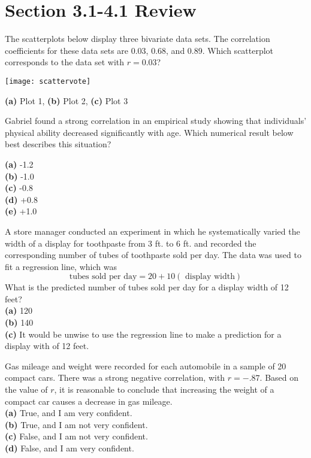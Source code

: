 \documentclass[Lecture.tex]{subfiles}
\begin{document}
\section{Section 3.1-4.1 Review}

\begin{frame}
The scatterplots below display three bivariate data sets.  The correlation coefficients for these data sets are 0.03, 0.68, and 0.89.  Which scatterplot corresponds to the data set with $r=0.03$?
\begin{center}
\texttt{[image: scattervote]}
\end{center}
{\bf (a)} Plot 1, {\bf (b)} Plot 2, {\bf (c)} Plot 3
\end{frame}

\begin{frame}
Gabriel found a strong correlation in an empirical study showing that individuals' physical ability decreased significantly with age.  Which numerical result below best describes this situation?\\
\begin{center}
{\bf (a)} -1.2\\
{\bf (b)} -1.0\\
{\bf (c)} -0.8\\
{\bf (d)} +0.8\\
{\bf (e)} +1.0
\end{center}
\end{frame}

\begin{frame}
A store manager conducted an experiment in which he systematically varied the width of a display for toothpaste from 3 ft. to 6 ft. and recorded the corresponding number of tubes of toothpaste sold per day.  The data was used to fit a regression line, which was $${\text{tubes sold per day}}=20+10({\text{ display width}})$$
What is the predicted number of tubes sold per day for a display width of 12 feet?\\
{\bf (a)} 120\\
{\bf (b)} 140\\
{\bf (c)} It would be unwise to use the regression line to make a prediction for a display with of 12 feet.
\end{frame}

\begin{frame}
Gas mileage and weight were recorded for each automobile in a sample of 20 compact cars.  There was a strong negative correlation, with $r=-.87$.  Based on the value of $r$, it is reasonable to conclude that increasing the weight of a compact car causes a decrease in gas mileage.\\
{\bf (a)} True, and I am very confident.\\
{\bf (b)} True, and I am not very confident.\\
{\bf (c)} False, and I am not very confident.\\
{\bf (d)} False, and I am very confident.
\end{frame}
\end{document}
